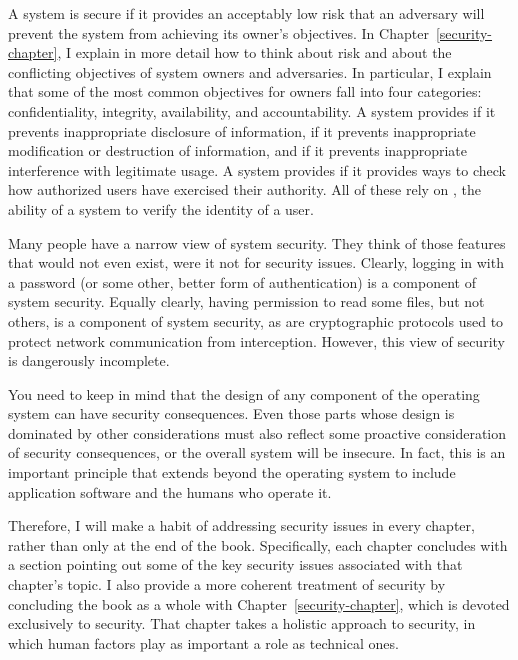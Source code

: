 A system is secure if it provides an acceptably low risk that an
adversary will prevent the system from achieving its owner's
objectives.  In Chapter~\ref{security-chapter}, I explain in more
detail how to think about risk and about the conflicting objectives
of system owners and adversaries.  In particular, I explain that some
of the most common objectives for owners fall into four categories:
confidentiality, integrity, availability, and accountability.  A
system provides  if it prevents inappropriate
disclosure of information,  if it prevents
inappropriate modification or destruction of information, and
 if it prevents inappropriate interference with
legitimate usage.  A system provides  if it
provides ways to check how authorized users have exercised their
authority.  All of these rely on , the ability
of a system to verify the identity of a user.

Many people have a narrow view of system security.  They think of
those features that would not even exist, were it not for security
issues.  Clearly, logging in with a password (or some other, better
form of authentication) is a component of system security.  Equally
clearly, having permission to read some files, but not others, is a
component of system security, as are cryptographic protocols used to
protect network communication from interception.  However, this view
of security is dangerously incomplete.

You need to keep in mind that the design of any component of the
operating system can have security consequences.  Even those parts
whose design is dominated by other considerations must also reflect
some proactive consideration of security consequences, or the overall
system will be insecure.  In fact, this is an important principle
that extends beyond the operating system to include application
software and the humans who operate it.

Therefore, I will make a habit of addressing security issues in every
chapter, rather than only at the end of the book.  Specifically, each
chapter concludes with a section pointing out some of the key security
issues associated with that chapter's topic.  I also provide a more
coherent treatment of security by concluding the book as a whole with
Chapter~\ref{security-chapter}, which is devoted exclusively to security.
That chapter takes a holistic approach to security, in which human
factors play as important a role as technical ones.

